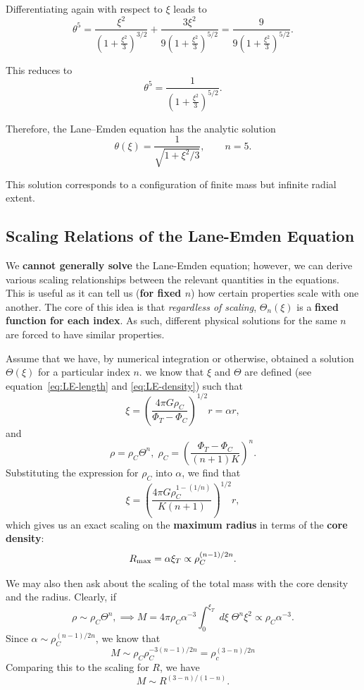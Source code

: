 Differentiating again with respect to $\xi$ leads to
\begin{equation}
    \theta^{5}
    = \frac{\xi^{2}}{\left(1+\frac{\xi^{2}}{3}\right)^{3/2}}
    + \frac{3\xi^{2}}{9\left(1+\frac{\xi^{2}}{3}\right)^{5/2}}
    = \frac{9}{9\left(1+\frac{\xi^{2}}{3}\right)^{5/2}}.
\end{equation}

This reduces to
\begin{equation}
    \theta^{5} = \frac{1}{\left(1+\frac{\xi^{2}}{3}\right)^{5/2}}.
\end{equation}

Therefore, the Lane--Emden equation has the analytic solution
\begin{equation}
    \theta(\xi) = \frac{1}{\sqrt{1+\xi^{2}/3}}, \qquad n=5.
\end{equation}

This solution corresponds to a configuration of finite mass but infinite radial extent. 

\subsection{Scaling Relations of the Lane-Emden Equation}

We \textbf{cannot generally solve} the Lane-Emden equation; however, we can derive various scaling relationships between the relevant quantities in the equations. This is useful as it can tell us (\textbf{for fixed $n$}) how certain properties scale with one another. The core of this idea is that \textit{regardless of scaling}, $\Theta_n(\xi)$ is a \textbf{fixed function for each index}. As such, different physical solutions for the same $n$ are forced to have similar properties.
\par
Assume that we have, by numerical integration or otherwise, obtained a solution $\Theta(\xi)$ for a particular index $n$. we know that $\xi$ and $\Theta$ are defined (see equation~\ref{eq:LE-length} and \eqref{eq:LE-density}) such that
\[
    \xi = \left(\frac{4\pi G \rho_C}{\Phi_T-\Phi_C}\right)^{1/2} r = \alpha r,
\]
and
\[
\rho = \rho_C \Theta^n,\;\rho_C = \left(\frac{\Phi_T-\Phi_C}{(n+1)K}\right)^n.
\]
Substituting the expression for $\rho_C$ into $\alpha$, we find that
\begin{equation}
    \boxed{
    \xi = \left(\frac{4\pi G \rho_C^{1-(1/n)}}{K(n+1)}\right)^{1/2}r,
    }
\end{equation}
which gives us an exact scaling on the \textbf{maximum radius} in terms of the \textbf{core density}:
\begin{equation}
    \label{eq:LE-scaling-radius}
    R_{\rm max} = \alpha \xi_{T} \propto \rho_C^{(n-1)/2n}.
\end{equation}
\par
We may also then ask about the scaling of the total mass with the core density and the radius. Clearly, if 
\[
\rho \sim \rho_C \Theta^n, \implies M = 4\pi \rho_C \alpha^{-3} \int_0^{\xi_T}\;d\xi \;\Theta^n \xi^2 \propto \rho_C \alpha^{-3}. 
\]
Since $\alpha \sim \rho_C^{(n-1)/2n}$, we know that
\[
M \sim \rho_C \rho_C^{-3(n-1)/2n} = \rho_c^{(3-n)/2n}
\]
Comparing this to the scaling for $R$, we have
\[
M \sim R^{(3-n)/(1-n)}.
\]

